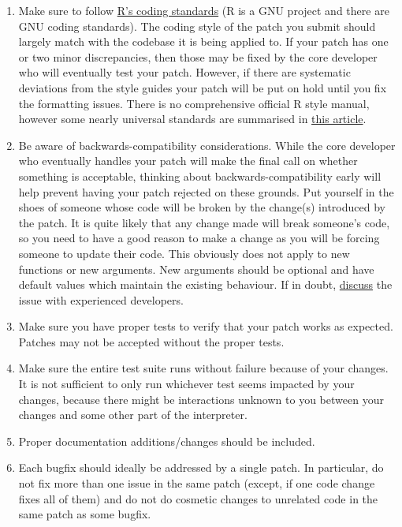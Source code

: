 \documentclass[
]{book}
\begin{document}
\begin{enumerate}
\def\labelenumi{\arabic{enumi}.}
\item
  Make sure to follow \href{https://cran.r-project.org/doc/manuals/r-release/R-ints.html\#R-coding-standards}{R's coding standards} (R is a GNU project and there are GNU coding standards). The coding style of the patch you submit should largely match with the codebase it is being applied to. If your patch has one or two minor discrepancies, then those may be fixed by the core developer who will eventually test your patch. However, if there are systematic deviations from the style guides your patch will be put on hold until you fix the formatting issues. There is no comprehensive official R style manual, however some nearly universal standards are summarised in \href{https://cran.r-project.org/web/packages/rockchalk/vignettes/Rstyle.pdf}{this article}.
\item
  Be aware of backwards-compatibility considerations. While the core developer who eventually handles your patch will make the final call on whether something is acceptable, thinking about backwards-compatibility early will help prevent having your patch rejected on these grounds. Put yourself in the shoes of someone whose code will be broken by the change(s) introduced by the patch. It is quite likely that any change made will break someone's code, so you need to have a good reason to make a change as you will be forcing someone to update their code. This obviously does not apply to new functions or new arguments. New arguments should be optional and have default values which maintain the existing behaviour. If in doubt, \hyperref[WhereToGetHelp]{discuss} the issue with experienced developers.
\item
  Make sure you have proper tests to verify that your patch works as expected. Patches may not be accepted without the proper tests.
\item
  Make sure the entire test suite runs without failure because of your changes. It is not sufficient to only run whichever test seems impacted by your changes, because there might be interactions unknown to you between your changes and some other part of the interpreter.
\item
  Proper documentation additions/changes should be included.
\item
  Each bugfix should ideally be addressed by a single patch. In particular, do not fix more than one issue in the same patch (except, if one code change fixes all of them) and do not do cosmetic changes to unrelated code in the same patch as some bugfix.
\end{enumerate}
\end{document}
